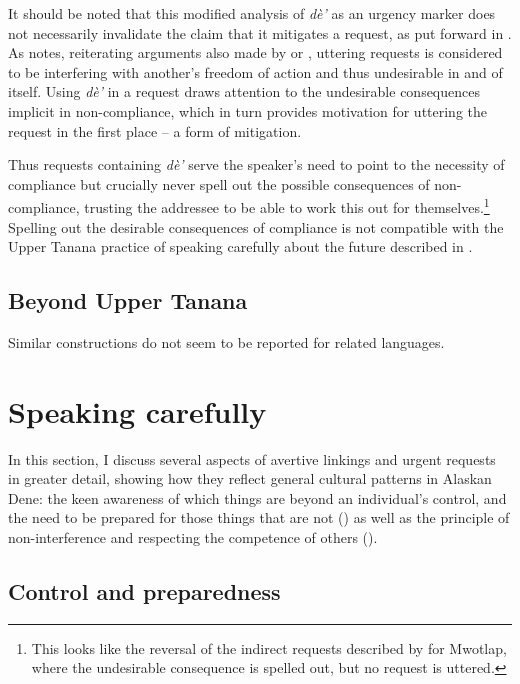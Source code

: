 \documentclass[output=paper,colorlinks,citecolor=brown
]{langscibook}
\begin{document}
It should be noted that this modified analysis of \textit{dè'} as an urgency marker does not necessarily invalidate the claim that it mitigates a request, as put forward in \citet[269]{LovickO2016}. As \citet{LovickO2016} notes, reiterating arguments also made by \citet{ScollonRScollonS1981} or \citet{RushforthSChisholmJ1991}, uttering requests is considered to be interfering with another's freedom of action and thus undesirable in and of itself. Using \textit{dè'} in a request draws attention to the undesirable consequences implicit in non-compliance, which in turn provides motivation for uttering the request in the first place -- a form of mitigation. 

Thus requests containing \textit{dè'} serve the speaker's need to point to the necessity of compliance but crucially never spell out the possible consequences of non-compliance, trusting the addressee to be able to work this out for themselves.\footnote{This looks like the reversal of the indirect requests described by \citet{chapters/francois} for Mwotlap, where the undesirable consequence is spelled out, but no request is uttered.} Spelling out the desirable consequences of compliance is not compatible with the Upper Tanana practice of speaking carefully about the future described in .

\subsection{Beyond Upper Tanana}
\label{subsubsection:beyond-urgent}

Similar constructions do not seem to be reported for related languages.


\section{Speaking carefully}
\label{section:speaking-carefully}

In this section, I discuss several aspects of avertive linkings and urgent requests in greater detail, showing how they reflect general cultural patterns in Alaskan Dene: the keen awareness of which things are beyond an individual's control, and the need to be prepared for those things that are not () as well as the principle of non-interference and respecting the competence of others ().

\subsection{Control and preparedness}
\label{subsection:not-afraid}
\end{document}
